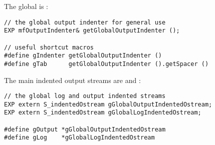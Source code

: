 The global  is :
\begin{lstlisting}[language=CPlusPlus]
// the global output indenter for general use
EXP mfOutputIndenter& getGlobalOutputIndenter ();

// useful shortcut macros
#define gIndenter getGlobalOutputIndenter ()
#define gTab      getGlobalOutputIndenter ().getSpacer ()
\end{lstlisting}

The main indented output streams are  and :
\begin{lstlisting}[language=CPlusPlus]
// the global log and output indented streams
EXP extern S_indentedOstream gGlobalOutputIndentedOstream;
EXP extern S_indentedOstream gGlobalLogIndentedOstream;

#define gOutput *gGlobalOutputIndentedOstream
#define gLog    *gGlobalLogIndentedOstream
\end{lstlisting}


